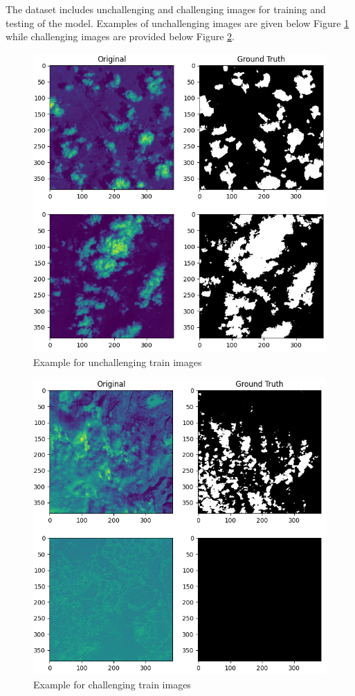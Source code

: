 \documentclass[conference]{IEEEtran}
\begin{document}
The dataset includes unchallenging and challenging images for training and testing of the model. Examples of unchallenging images are given below Figure \ref{easy} while challenging images are provided below Figure \ref{hard}. 
\begin{figure}[!htbp]
    \centering
    \includegraphics[scale=0.3]{images/easy.png}
    \caption{Example for unchallenging train images}
    \label{easy}
\end{figure}

\begin{figure}[!htbp]
    \centering
    \includegraphics[scale=0.3]{images/hard.png}
    \caption{Example for challenging train images}
    \label{hard}
\end{figure}
\newpage
\end{document}
